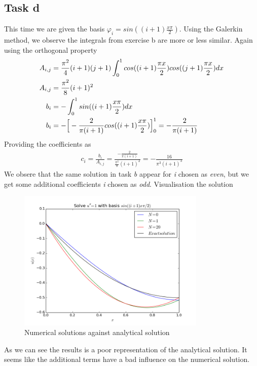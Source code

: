 \documentclass[a4paper,norsk]{article}
\begin{document}
\subsection*{Task d}
This time we are given the basis $\varphi_i = sin((i+1)\frac{x\pi}{2})$. Using the Galerkin method, we observe the integrals from exercise b are more or less similar. Again using the orthogonal property
\begin{align*}
A_{i,j} &= \frac{\pi^2}{4}(i+1)(j+1) \int_0^1 cos((i+1)\frac{\pi x}{2}) cos((j+1)\frac{\pi x}{2}) dx \\
A_{i,j} &= \frac{\pi^2}{8}(i+1)^2 \\
\vspace{5mm}
b_i &=  -\int_0^1 sin((i+1)\frac{x\pi}{2}) dx \\
b_i &= - \Big[-\frac{2}{\pi(i+1)}cos((i+1)\frac{x\pi}{2})  \Big]_0^1 = -\frac{2}{\pi(i+1)}
\end{align*}
Providing the coefficients as 
\begin{align*}
c_i = \frac{b_i}{A_{i,j}} = \frac{-\frac{2}{\pi(i+1)}}{\frac{\pi^2}{8}(i+1)^2} = -\frac{16}{\pi^3(i+1)^3}
\end{align*}
We obsere that the same solution in task \textit{b} appear for \textit{i} chosen as \textit{even}, but we get some additional coefficients \textit{i} chosen as \textit{odd}. Visualisation the solution
\begin{figure}[h!]
  \caption{Numerical solutions against analytical solution}
  \centering
    \includegraphics[width=0.8\textwidth]{Taskd.png}
\end{figure}
As we can see the results is a poor representation of the analytical solution. It seems like the additional terms have a bad influence on the numerical solution. 
\end{document}

